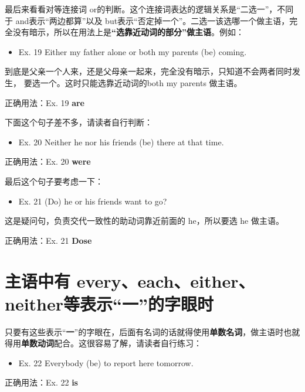 最后来看看对等连接词 or的判断。这个连接词表达的逻辑关系是“二选一”，不同
于 and表示“两边都算”以及 but表示“否定掉一个”。二选一该选哪一个做主语，完
全没有暗示，所以在用法上是\textbf{“选靠近动词的部分”做主语}。例如：

\begin{mybox}

  \begin{itemize}
  \item   Ex. 19 Either my father alone or both my parents (be) coming.
  \end{itemize}

  到底是父亲一个人来，还是父母亲一起来，完全没有暗示，只知道不会两者同时发生，
  要选一个。这时只能选靠近动词的both my parents 做主语。

  \tcblower

  正确用法：Ex. 19 \textbf{are}
\end{mybox}

下面这个句子差不多，请读者自行判断：
\begin{mybox}
  \begin{itemize}
  \item   Ex. 20 Neither he nor his friends (be) there at that time.
  \end{itemize}

  \tcblower

  正确用法：Ex. 20 \textbf{were}
\end{mybox}

最后这个句子要考虑一下：

\begin{mybox}
  \begin{itemize}
  \item   Ex. 21 (Do) he or his friends want to go?
  \end{itemize}

  这是疑问句，负责交代一致性的助动词靠近前面的 he，所以要选 he 做主语。

  \tcblower

  正确用法：Ex. 21 \textbf{Dose}
\end{mybox}

\section{主语中有 every、each、either、neither等表示“一”的字眼时}

只要有这些表示“\textbf{一}”的字眼在，后面有名词的话就得使用\textbf{单数名词}，做主语时也就得用\textbf{单数动词}配合。这很容易了解，请读者自行练习：
\begin{mybox}

  \begin{itemize}
  \item   Ex. 22 Everybody (be) to report here tomorrow.
  \end{itemize}

  \tcblower

  正确用法：Ex. 22 \textbf{is}
\end{mybox}

